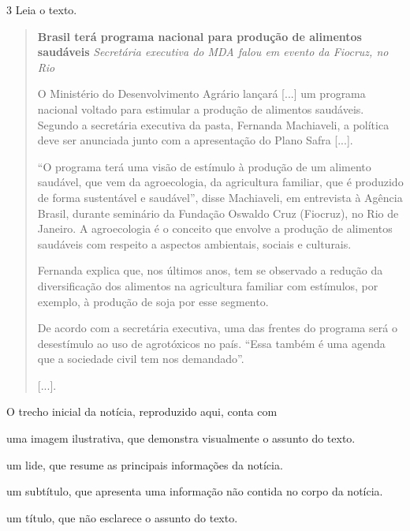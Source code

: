 \num{3} Leia o texto.

\begin{quote}
\textbf{Brasil terá programa nacional para produção de alimentos saudáveis}
\textit{Secretária executiva do MDA falou em evento da Fiocruz, no Rio}

O Ministério do Desenvolvimento Agrário lançará {[}...{]} um programa nacional voltado para estimular a produção de alimentos saudáveis. Segundo a secretária executiva da pasta, Fernanda Machiaveli, a política deve ser anunciada junto com a apresentação do Plano Safra {[}...{]}.

“O programa terá uma visão de estímulo à produção de um alimento saudável, que vem da agroecologia, da agricultura familiar, que é produzido de forma sustentável e saudável”, disse Machiaveli, em entrevista à Agência Brasil, durante seminário da Fundação Oswaldo Cruz (Fiocruz), no Rio de Janeiro. A agroecologia é o conceito que envolve a produção de alimentos saudáveis com respeito a aspectos ambientais, sociais e culturais.

Fernanda explica que, nos últimos anos, tem se observado a redução da diversificação dos alimentos na agricultura familiar com estímulos, por exemplo, à produção de soja por esse segmento.

De acordo com a secretária executiva, uma das frentes do programa será o desestímulo ao uso de agrotóxicos no país. “Essa também é uma agenda que a sociedade civil tem nos demandado”.

{[}...{]}.

\end{quote}

O trecho inicial da notícia, reproduzido aqui, conta com

\begin{escolha}
\item uma imagem ilustrativa, que demonstra visualmente o assunto do texto.

\item um lide, que resume as principais informações da notícia.

\item um subtítulo, que apresenta uma informação não contida no corpo da notícia.

\item um título, que não esclarece o assunto do texto.
\end{escolha}


